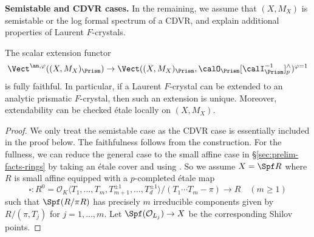 \bigskip

\noindent
\textbf{Semistable and CDVR cases.}
In the remaining, we assume that $(X, M_X)$ is semistable or the log formal spectrum of a CDVR, and explain additional properties of Laurent $F$-crystals.

\begin{prop} \label{prop:etale-realization-fullyfaithful}
The scalar extension functor 
\[
\Vect^{\an,\varphi}((X,M_X)_\Prism) \to \Vect((X,M_X)_\Prism,\calO_\Prism[\calI_\Prism^{-1}]^\wedge_p)^{\varphi=1}
\]
is fully faithful. 
In particular, if a Laurent $F$-crystal can be extended to an analytic prismatic $F$-crystal, then such an extension is unique. Moreover, extendability can be checked \'etale locally on $(X, M_X)$.
\end{prop}


\begin{proof}
We only treat the semistable case as the CDVR case is essentially included in the proof below.
The faithfulness follows from the construction. For the fullness, we can reduce the general case to the small affine case in \S\ref{sec:prelim-facts-rings} by taking an \'etale cover and using \cite[Rem.~4.2]{koshikawa}. So we assume $X = \Spf R$ where $R$ is small affine equipped with a $p$-completed \'etale map
\[
\square\colon R^{0} = \mathcal{O}_K \langle T_1, \ldots, T_m, T_{m+1}^{\pm 1}, \ldots, T_d^{\pm 1}\rangle / (T_1\cdots T_m - \pi) \rightarrow R \quad (m \geq 1)
\]
such that $\Spf (R/\pi R)$ has precisely $m$ irreducible components given by $R/(\pi, T_j)$ for $j = 1, \ldots, m$. Let $\Spf (\mathcal{O}_{L_j}) \rightarrow X$ be the corresponding Shilov points.   


\end{proof}
